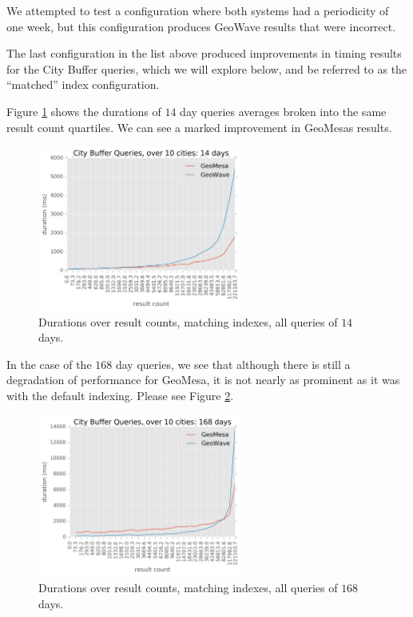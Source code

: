 We attempted to test a configuration where both systems had a periodicity of one week, but this configuration
produces GeoWave results that were incorrect.

The last configuration in the list above produced improvements in timing results for the City Buffer queries, which we will explore below,
and be referred to as the ``matched'' index configuration.

Figure \ref{matching14} shows the durations of $14$ day queries averages broken into the same result count quartiles.
We can see a marked improvement in GeoMesas results.

\begin{figure}[h!tb]
  \centering
  \includegraphics[width=0.60\textwidth]{../docs/img/gdelt/014-days-matching.png}
  \caption{Durations over result counts, matching indexes, all queries of $14$ days.}
  \label{matching14}
\end{figure}

In the case of the $168$ day queries, we see that although there is still a degradation of performance for GeoMesa,
it is not nearly as prominent as it was with the default indexing.
Please see Figure \ref{matching168}.

\begin{figure}[h!tb]
  \centering
  \includegraphics[width=0.60\textwidth]{../docs/img/gdelt/168-days-matching.png}
  \caption{Durations over result counts, matching indexes, all queries of $168$ days.}
  \label{matching168}
\end{figure}


